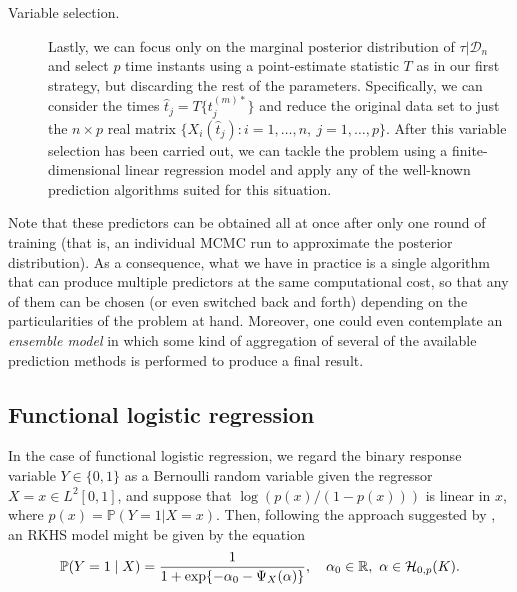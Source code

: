 \documentclass[ba]{imsart}
\numberwithin{equation}{section}
\theoremstyle{plain}
\newcommand{\R}{\mathbb{R}}
\newcommand{\Hcal}{\ensuremath\mathcal{H}}
\begin{document}
\begin{description}
  \item[Variable selection.] Lastly, we can focus only on the marginal posterior distribution of \(\tau|\mathcal D_n\) and select \(p\) time instants using a point-estimate statistic \(T\) as in our first strategy, but discarding the rest of the parameters. Specifically, we can consider the times \(\hat t_j = T\{t_j^{(m)*}\}\) and reduce the original data set to just the \(n\times p\) real matrix \(\{X_i(\hat t_j): i=1, \dots,n, \ j=1,\dots,p\}\). After this variable selection has been carried out, we can tackle the problem using a finite-dimensional linear regression model and apply any of the well-known prediction algorithms suited for this situation.
\end{description}

Note that these predictors can be obtained all at once after only one round of training (that is, an individual MCMC run to approximate the posterior distribution). As a consequence, what we have in practice is a single algorithm that can produce multiple predictors at the same computational cost, so that any of them can be chosen (or even switched back and forth) depending on the particularities of the problem at hand. Moreover, one could even contemplate an \textit{ensemble model} in which some kind of aggregation of several of the available prediction methods is performed to produce a final result.

\subsection{Functional logistic regression}\label{sec:rkhs-logistic-model}

In the case of functional logistic regression, we regard the binary response variable \(Y\in\{0, 1\}\) as a Bernoulli random variable given the regressor \(X=x \in L^2[0, 1]\), and suppose that \(\log\left(p(x)/(1-p(x))\right)\) is linear in \(x\), where \(p(x)=\mathbb P(Y=1| X=x)\). Then, following the approach  suggested by \citet{berrendero2018functional}, an RKHS model might be given  by the  equation
\begin{equation}\label{eq:rkhs-model-logistic}
  \mathbb P(Y=1 \mid X) = \frac{1}{1 + \exp\{-\alpha_0 - \Psi_X(\alpha)\}}, \quad \alpha_0 \in \R, \ \alpha \in \Hcal_{0,p}(K).
\end{equation}
\end{document}
